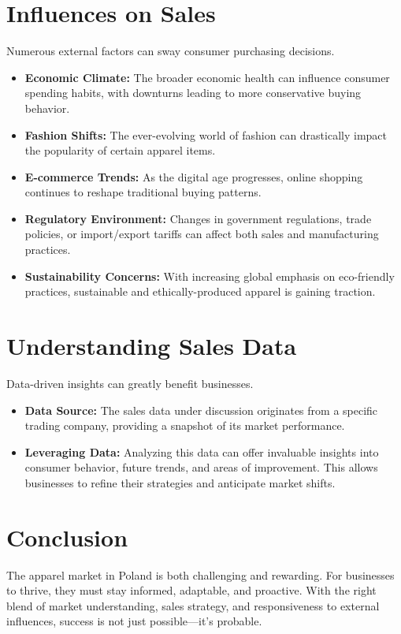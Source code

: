 \documentclass{article}
\begin{document}
\section{Influences on Sales}
Numerous external factors can sway consumer purchasing decisions.
\begin{itemize}
    \item \textbf{Economic Climate:} The broader economic health can influence consumer spending habits, with downturns leading to more conservative buying behavior.
    \item \textbf{Fashion Shifts:} The ever-evolving world of fashion can drastically impact the popularity of certain apparel items.
    \item \textbf{E-commerce Trends:} As the digital age progresses, online shopping continues to reshape traditional buying patterns.
    \item \textbf{Regulatory Environment:} Changes in government regulations, trade policies, or import/export tariffs can affect both sales and manufacturing practices.
    \item \textbf{Sustainability Concerns:} With increasing global emphasis on eco-friendly practices, sustainable and ethically-produced apparel is gaining traction.
\end{itemize}

\section{Understanding Sales Data}
Data-driven insights can greatly benefit businesses.
\begin{itemize}
    \item \textbf{Data Source:} The sales data under discussion originates from a specific trading company, providing a snapshot of its market performance.
    \item \textbf{Leveraging Data:} Analyzing this data can offer invaluable insights into consumer behavior, future trends, and areas of improvement. This allows businesses to refine their strategies and anticipate market shifts.
\end{itemize}

\section{Conclusion}
The apparel market in Poland is both challenging and rewarding. For businesses to thrive, they must stay informed, adaptable, and proactive. With the right blend of market understanding, sales strategy, and responsiveness to external influences, success is not just possible—it's probable.





    
\end{document}
